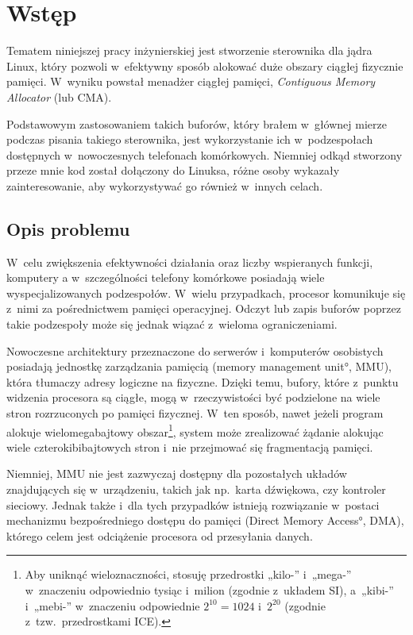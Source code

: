 \chapter{Wstęp}

Tematem niniejszej pracy inżynierskiej jest stworzenie sterownika dla
jądra Linux, który pozwoli w~efektywny sposób alokować duże obszary
ciągłej fizycznie pamięci.  W~wyniku powstał menadżer ciągłej pamięci,
{\it Contiguous Memory Allocator} (lub CMA).

Podstawowym zastosowaniem takich buforów, który brałem w~głównej
mierze podczas pisania takiego sterownika, jest wykorzystanie ich
w~podzespołach dostępnych w~nowoczesnych telefonach komórkowych.
Niemniej odkąd stworzony przeze mnie kod został dołączony do Linuksa,
różne osoby wykazały zainteresowanie, aby wykorzystywać go również
w~innych celach.


\section{Opis problemu}

W~celu zwiększenia efektywności działania oraz liczby wspieranych
funkcji, komputery a w~szczególności telefony komórkowe posiadają
wiele wyspecjalizowanych podzespołów.  W~wielu przypadkach, procesor
komunikuje się z~nimi za pośrednictwem pamięci operacyjnej.  Odczyt
lub zapis buforów poprzez takie podzespoły może się jednak wiązać
z~wieloma ograniczeniami.

Nowoczesne architektury przeznaczone do serwerów i~komputerów
osobistych posiadają jednostkę zarządzania pamięcią (\ang{memory
  management unit}, MMU), która tłumaczy adresy logiczne na fizyczne.
Dzięki temu, bufory, które z~punktu widzenia procesora są ciągłe, mogą
w~rzeczywistości być podzielone na wiele stron rozrzuconych po pamięci
fizycznej.  W~ten sposób, nawet jeżeli program alokuje
wielomegabajtowy obszar\footnote{Aby uniknąć wieloznaczności, stosuję
  przedrostki „kilo-” i~„mega-” w~znaczeniu odpowiednio tysiąc
  i~milion (zgodnie z~układem SI), a~„kibi-” i~„mebi-” w~znaczeniu
  odpowiednie $2^{10} = 1024$ i~$2^{20}$ (zgodnie
  z~tzw.\ przedrostkami ICE).}, system może zrealizować żądanie
alokując wiele czterokibibajtowych stron i~nie przejmować się
fragmentacją pamięci.

Niemniej, MMU nie jest zazwyczaj dostępny dla pozostałych układów
znajdujących się w~urządzeniu, takich jak np.\ karta dźwiękowa, czy
kontroler sieciowy.  Jednak także i~dla tych przypadków istnieją
rozwiązanie w~postaci mechanizmu bezpośredniego dostępu do pamięci
(\ang{Direct Memory Access}, DMA), którego celem jest odciążenie
procesora od przesyłania danych.

